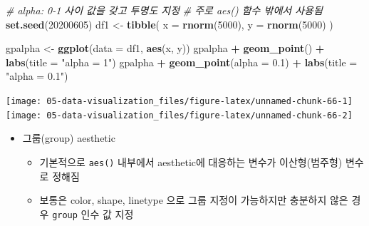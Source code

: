 \documentclass[
  11pt,
]{krantz}
\newenvironment{Shaded}{\begin{snugshade}}{\end{snugshade}}
\newcommand{\CommentTok}[1]{\textcolor[rgb]{0.37,0.37,0.37}{\textit{#1}}}
\newcommand{\DataTypeTok}[1]{\textcolor[rgb]{0.27,0.27,0.27}{#1}}
\newcommand{\DecValTok}[1]{\textcolor[rgb]{0.06,0.06,0.06}{#1}}
\newcommand{\FloatTok}[1]{\textcolor[rgb]{0.06,0.06,0.06}{#1}}
\newcommand{\KeywordTok}[1]{\textcolor[rgb]{0.27,0.27,0.27}{\textbf{#1}}}
\newcommand{\NormalTok}[1]{#1}
\newcommand{\OperatorTok}[1]{\textcolor[rgb]{0.43,0.43,0.43}{\textbf{#1}}}
\newcommand{\StringTok}[1]{\textcolor[rgb]{0.5,0.5,0.5}{#1}}
\providecommand{\tightlist}{%
  \setlength{\itemsep}{0pt}\setlength{\parskip}{0pt}}
\begin{document}
\normalsize

\footnotesize

\begin{Shaded}
\begin{Highlighting}[]
\CommentTok{# alpha: 0-1 사이 값을 갖고 투명도 지정}
\CommentTok{# 주로 aes() 함수 밖에서 사용됨}
\KeywordTok{set.seed}\NormalTok{(}\DecValTok{20200605}\NormalTok{)}
\NormalTok{df1 <-}\StringTok{ }\KeywordTok{tibble}\NormalTok{(}
  \DataTypeTok{x =} \KeywordTok{rnorm}\NormalTok{(}\DecValTok{5000}\NormalTok{), }
  \DataTypeTok{y =} \KeywordTok{rnorm}\NormalTok{(}\DecValTok{5000}\NormalTok{)}
\NormalTok{)}

\NormalTok{gpalpha <-}\StringTok{ }\KeywordTok{ggplot}\NormalTok{(}\DataTypeTok{data =}\NormalTok{ df1, }\KeywordTok{aes}\NormalTok{(x, y))}
\NormalTok{gpalpha }\OperatorTok{+}\StringTok{ }\KeywordTok{geom_point}\NormalTok{() }\OperatorTok{+}\StringTok{ }
\StringTok{  }\KeywordTok{labs}\NormalTok{(}\DataTypeTok{title =} \StringTok{"alpha = 1"}\NormalTok{) }
\NormalTok{gpalpha }\OperatorTok{+}\StringTok{ }\KeywordTok{geom_point}\NormalTok{(}\DataTypeTok{alpha =} \FloatTok{0.1}\NormalTok{) }\OperatorTok{+}\StringTok{ }
\StringTok{  }\KeywordTok{labs}\NormalTok{(}\DataTypeTok{title =} \StringTok{"alpha = 0.1"}\NormalTok{)}
\end{Highlighting}
\end{Shaded}

\texttt{[image: 05-data-visualization\_files/figure-latex/unnamed-chunk-66-1]} \texttt{[image: 05-data-visualization\_files/figure-latex/unnamed-chunk-66-2]}

\normalsize

\begin{itemize}
\tightlist
\item
  그룹(group) aesthetic

  \begin{itemize}
  \tightlist
  \item
    기본적으로 \texttt{aes()} 내부에서 aesthetic에 대응하는 변수가 이산형(범주형) 변수로 정해짐
  \item
    보통은 color, shape, linetype 으로 그룹 지정이 가능하지만 충분하지 않은 경우 \texttt{group} 인수 값 지정
  \end{itemize}
\end{itemize}

\footnotesize
\end{document}
